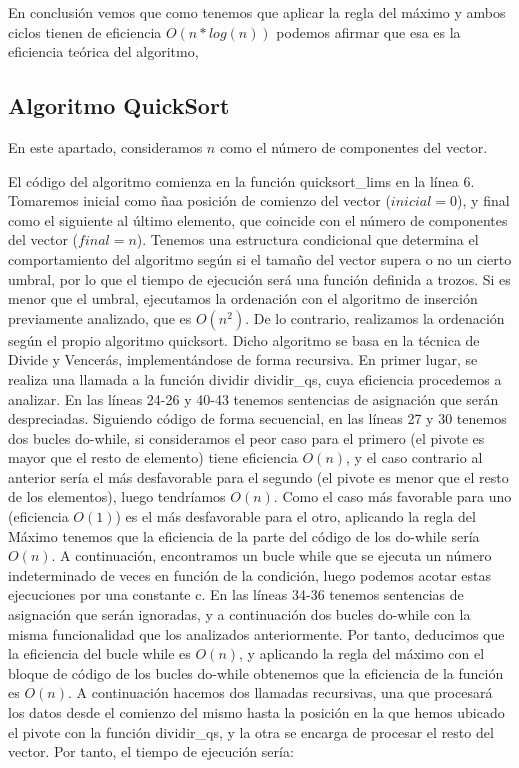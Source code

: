 \documentclass{homework}
\begin{document}
    En conclusión vemos que como tenemos que aplicar la regla del máximo y ambos ciclos tienen de eficiencia $O(n*log(n))$ podemos afirmar que esa es la eficiencia
    teórica del algoritmo, 

    \subsection{Algoritmo QuickSort}
    
     

    En este apartado, consideramos $n$ como el número de componentes del vector. 

    El código del algoritmo comienza en la función quicksort\_lims en la línea 6. Tomaremos inicial 
    como ñaa posición de comienzo del vector ($inicial = 0$), y final como el siguiente al último elemento, 
    que coincide con el número de componentes del vector ($final = n$).
    Tenemos una estructura condicional que determina el comportamiento del algoritmo según si el tamaño del vector 
    supera o no un cierto umbral, por lo que el tiempo de ejecución será una función definida a trozos. Si es menor 
    que el umbral, ejecutamos la ordenación con el algoritmo de inserción previamente analizado, que es $O(n^2)$. De lo
    contrario, realizamos la ordenación según el propio algoritmo quicksort. Dicho algoritmo se basa en la técnica de Divide
    y Vencerás, implementándose de forma recursiva. En primer lugar, se realiza una llamada a la función dividir dividir\_qs, 
    cuya eficiencia procedemos a analizar. En las líneas 24-26 y 40-43 tenemos sentencias de asignación que serán despreciadas. 
    Siguiendo código de forma secuencial, en las líneas 27 y 30 tenemos dos bucles do-while, si consideramos el peor caso para 
    el primero (el pivote es mayor que el resto de elemento) tiene eficiencia $O(n)$, y el caso contrario al anterior sería el 
    más desfavorable para el segundo (el pivote es menor que el resto de los elementos), luego tendríamos $O(n)$. Como el caso más 
    favorable para uno (eficiencia $O(1)$) es el más desfavorable para el otro, aplicando la regla del Máximo tenemos que la 
    eficiencia de la parte del código de los do-while sería $O(n)$.  A continuación, encontramos un bucle while que se ejecuta un 
    número indeterminado de veces en función de la condición, luego podemos acotar estas ejecuciones por una constante c. En las 
    líneas 34-36 tenemos sentencias de asignación que serán ignoradas, y a continuación dos bucles do-while con la misma funcionalidad
    que los analizados anteriormente. Por tanto, deducimos que la eficiencia del bucle while es $O(n)$, y aplicando la regla del 
    máximo con el bloque de código de los bucles do-while obtenemos que la eficiencia de la función es $O(n)$. A continuación hacemos dos llamadas
    recursivas, una que procesará los datos desde el comienzo del mismo hasta la posición en la que hemos ubicado el pivote con la 
    función dividir\_qs, y la otra se encarga de procesar el resto del vector. Por tanto, el tiempo de ejecución sería:
\end{document}
